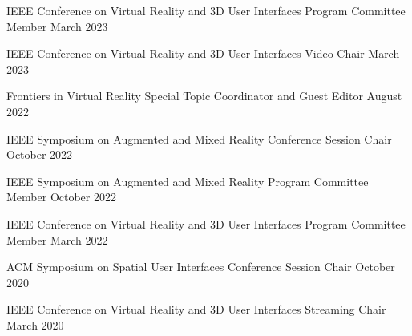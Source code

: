 
\begin{cventries}
  
  \cventry
    {IEEE Conference on Virtual Reality and 3D User Interfaces} %
    {Program Committee Member} %
    {March 2023} %
    {} %
    {}
    \vspace{-0.15in}
  
  \cventry
    {IEEE Conference on Virtual Reality and 3D User Interfaces} %
    {Video Chair} %
    {March 2023} %
    {} %
    {}
    \vspace{-0.15in}

  \cventry
    {Frontiers in Virtual Reality} %
    {Special Topic Coordinator and Guest Editor} %
    {August 2022} %
    {} %
    {}
    \vspace{-0.15in}

  \cventry
    {IEEE Symposium on Augmented and Mixed Reality} %
    {Conference Session Chair} %
    {October 2022} %
    {} %
    {}
    \vspace{-0.15in}

  \cventry
    {IEEE Symposium on Augmented and Mixed Reality} %
    {Program Committee Member} %
    {October 2022} %
    {} %
    {}
    \vspace{-0.15in}
  
  \cventry
    {IEEE Conference on Virtual Reality and 3D User Interfaces} %
    {Program Committee Member} %
    {March 2022} %
    {} %
    {}
    \vspace{-0.15in}
    
  \cventry
    {ACM Symposium on Spatial User Interfaces} %
    {Conference Session Chair} %
    {October 2020} %
    {} %
    {}
    \vspace{-0.15in}

  \cventry
    {IEEE Conference on Virtual Reality and 3D User Interfaces} %
    {Streaming Chair} %
    {March 2020} %
    {} %
    {}
    \vspace{-0.15in}


\end{cventries}
